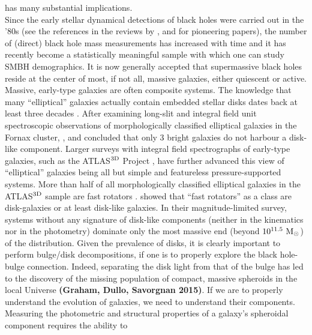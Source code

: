 \documentclass[preprint2]{emulateapj}
\begin{document}
has many substantial implications. \\
Since the early stellar dynamical detections of black holes were carried out in the '80s 
(see the references in the reviews by \citealt{kormendyrichstone1995}, \citealt{richstone1998} 
and \citealt{graham2015bulges} for pioneering papers), 
the number of (direct) black hole mass measurements has increased with time 
and it has recently become a statistically meaningful sample  
with which one can study SMBH demographics. 
It is now generally accepted that supermassive black holes reside at the center of most, if not all, 
massive galaxies, either quiescent or active. \\
Massive, early-type galaxies are often composite systems. 
The knowledge that many ``elliptical'' galaxies actually contain embedded stellar disks dates back  
at least three decades  
\citep{capaccioli1987,carter1987,rixwhite1990,bender1990,scorzabender1990,nieto1991,rixwhite1992,scorzabender1995}. 
After examining long-slit and integral field unit spectroscopic observations of morphologically classified elliptical galaxies in the Fornax cluster, 
\cite{donofrio1995}, \cite{graham1998fornax} and \cite{scott2014} concluded that only 3 bright galaxies do not harbour a disk-like component.
Larger surveys with integral field spectrographs of early-type galaxies, such as the ATLAS$^{\rm 3D}$ Project \citep{cappellari2011}, 
have further advanced this view of ``elliptical'' galaxies being all but simple and featureless pressure-supported systems.
More than half of all morphologically classified elliptical galaxies in the ATLAS$^{\rm 3D}$ sample are fast rotators \citep{atlas3dIII-MNRAS}.
\cite{krajnovic2013} showed that ``fast rotators'' as a class are disk-galaxies or at least disk-like galaxies. 
In their magnitude-limited survey, systems 
without any signature of disk-like components (neither in the kinematics nor in the photometry) 
dominate only the most massive end (beyond $10^{11.5}~\rm M_\odot$) of the distribution. 
Given the prevalence of disks, it is clearly important to perform bulge/disk decompositions, 
if one is to properly explore the black hole-bulge connection. 
Indeed, separating the disk light from that of the bulge has led to the discovery of the missing population of compact, massive spheroids 
in the local Universe {\bf (Graham, Dullo, Savorgnan 2015)}.
If we are to properly understand the evolution of galaxies, we need to understand their components.\\
Measuring the photometric and structural properties of a galaxy's spheroidal component requires the ability to 
\end{document}

